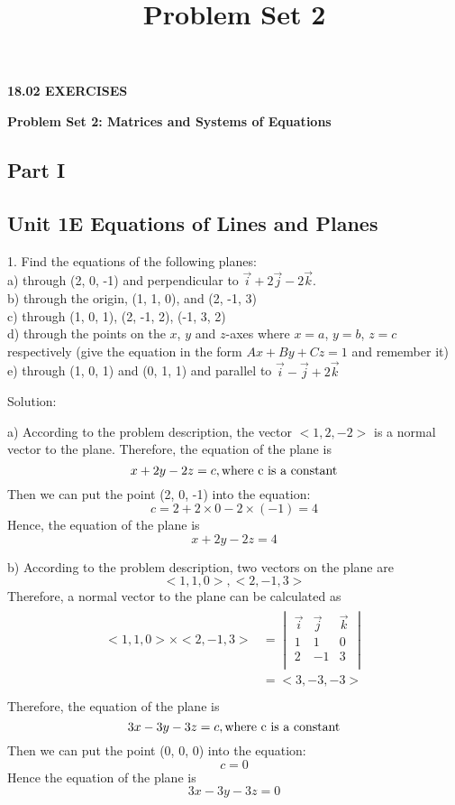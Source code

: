 \documentclass{article}
\title{Problem Set 2}
\author{}
\date{}
\begin{document}
\begin{center}
{\rmfamily\bfseries\Large 18.02 EXERCISES}

\vspace{25px}

{\rmfamily\bfseries\LARGE Problem Set 2: Matrices and Systems of Equations}
\end{center}

\begin{center}
\section*{Part I}
\end{center}

\subsection*{Unit 1E Equations of Lines and Planes}

1. Find the equations of the following planes: \\
a) through (2, 0, -1) and perpendicular to $\vec{i} + 2\vec{j} - 2\vec{k}$. \\
b) through the origin, (1, 1, 0), and (2, -1, 3) \\
c) through (1, 0, 1), (2, -1, 2), (-1, 3, 2) \\
d) through the points on the $x$, $y$ and $z$-axes where $x = a$, $y = b$, 
$z = c$ respectively (give the equation in the form $Ax + By + Cz = 1$ and 
remember it) \\
e) through (1, 0, 1) and (0, 1, 1) and parallel to $\vec{i} - \vec{j} + 2\vec{k}$

Solution:

a) According to the problem description, the vector $<1, 2, -2>$ is a normal 
vector to the plane. Therefore, the equation of the plane is
\[ x + 2y - 2z = c, \textnormal{where c is a constant} \]
Then we can put the point (2, 0, -1) into the equation:
\[ c = 2 + 2 \times 0 - 2 \times (-1) = 4 \]
Hence, the equation of the plane is 
\[ x + 2y - 2z = 4 \]

b) According to the problem description, two vectors on the plane are
\[ <1, 1, 0>, <2, -1, 3> \]
Therefore, a normal vector to the plane can be calculated as
\begin{gather*}
  \begin{split}
    <1, 1, 0> \times <2, -1, 3> 
    &= \begin{vmatrix}
         \vec{i} & \vec{j} & \vec{k} \\
         1 & 1 & 0 \\
         2 & -1 & 3 \\
       \end{vmatrix} \\
    &= <3, -3, -3> \\
  \end{split}
\end{gather*}
Therefore, the equation of the plane is
\[ 3x - 3y - 3z = c, \textnormal{where c is a constant} \]
Then we can put the point (0, 0, 0) into the equation:
\[ c = 0 \]
Hence the equation of the plane is 
\[ 3x - 3y - 3z = 0 \]
\end{document}

